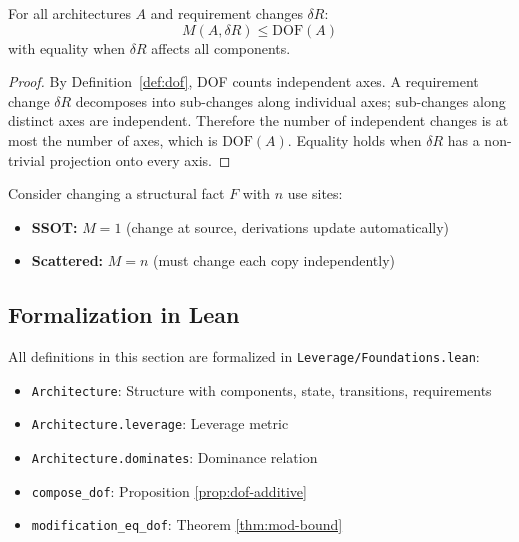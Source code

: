 \begin{theorem}\label{thm:mod-bound}
For all architectures $A$ and requirement changes $\delta R$:
\[
M(A, \delta R) \leq \text{DOF}(A)
\]
with equality when $\delta R$ affects all components.
\end{theorem}

\begin{proof}
By Definition~\ref{def:dof}, DOF counts independent axes. A requirement change $\delta R$ decomposes into sub-changes along individual axes; sub-changes along distinct axes are independent. Therefore the number of independent changes is at most the number of axes, which is $\text{DOF}(A)$. Equality holds when $\delta R$ has a non-trivial projection onto every axis.
\end{proof}

\begin{example}
Consider changing a structural fact $F$ with $n$ use sites:
\begin{itemize}
\item \textbf{SSOT:} $M = 1$ (change at source, derivations update automatically)
\item \textbf{Scattered:} $M = n$ (must change each copy independently)
\end{itemize}
\end{example}

\subsection{Formalization in Lean}

All definitions in this section are formalized in \texttt{Leverage/Foundations.lean}:
\begin{itemize}
\item \texttt{Architecture}: Structure with components, state, transitions, requirements
\item \texttt{Architecture.leverage}: Leverage metric
\item \texttt{Architecture.dominates}: Dominance relation
\item \texttt{compose\_dof}: Proposition \ref{prop:dof-additive}
\item \texttt{modification\_eq\_dof}: Theorem \ref{thm:mod-bound}
\end{itemize}
